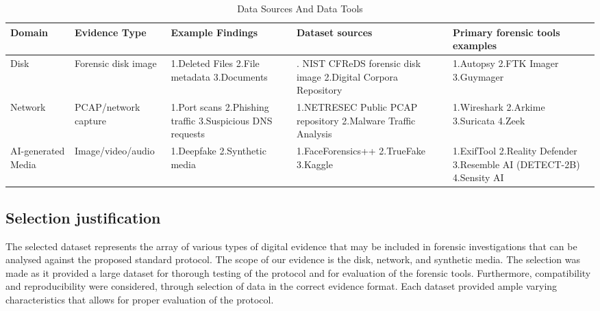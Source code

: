 \documentclass[a4paper]{report}
\begin{document}
\begin{justify}
\begin{table}[H]
\caption{Data Sources And Data Tools}
\label{tab:inclusion-exclusion}
\small
\begin{tabularx}{\textwidth}{|>{\raggedright\arraybackslash}X|>{\raggedright\arraybackslash}X|>{\raggedright\arraybackslash}X|>{\raggedright\arraybackslash}X|>{\raggedright\arraybackslash}X|}
\hline
Domain & Evidence Type & Example Findings & Dataset sources & Primary forensic tools examples \\
\hline
Disk & Forensic disk image & 1.Deleted Files \newline 2.File metadata \newline 3.Documents & 1. NIST CFReDS forensic disk image \newline 2.Digital Corpora Repository & 1.Autopsy \newline 2.FTK Imager \newline 3.Guymager \\
\hline
Network & PCAP/network capture & 1.Port scans \newline 2.Phishing traffic \newline 3.Suspicious DNS requests & 1.NETRESEC Public PCAP repository \newline 2.Malware Traffic Analysis & 1.Wireshark \newline 2.Arkime \newline 3.Suricata \newline 4.Zeek \\
\hline
AI-generated Media & Image/video/audio & 1.Deepfake \newline 2.Synthetic media & 1.FaceForensics++ \newline 2.TrueFake \newline 3.Kaggle & 1.ExifTool \newline 2.Reality Defender \newline 3.Resemble AI (DETECT-2B) \newline 4.Sensity AI \\
\hline
\end{tabularx}
\end{table}


\subsection{ Selection justification}
The selected dataset represents the array of various types of digital evidence that may be included in forensic investigations that can be analysed against the proposed standard protocol. The scope of our evidence is the disk, network, and synthetic media. The selection was made as it provided a large dataset for thorough testing of the protocol and for evaluation of the forensic tools. Furthermore, compatibility and reproducibility were considered, through selection of data in the correct evidence format. Each dataset provided ample varying characteristics that allows for proper evaluation of the protocol. 


\end{justify}
\end{document}
